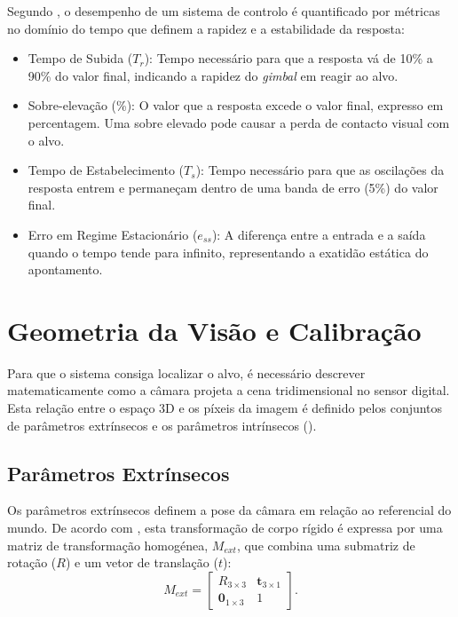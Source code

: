 Segundo \cite{nise2019control}, o desempenho de um sistema de controlo é quantificado por métricas no domínio do tempo que definem a rapidez e a estabilidade da resposta:
\begin{itemize}
    \item Tempo de Subida ($T_r$): Tempo necessário para que a resposta vá de 10\% a 90\% do valor final, indicando a rapidez do \emph{gimbal} em reagir ao alvo.
    \item Sobre-elevação (\%): O valor que a resposta excede o valor final, expresso em percentagem. Uma sobre elevado pode causar a perda de contacto visual com o alvo.
    \item Tempo de Estabelecimento ($T_s$): Tempo necessário para que as oscilações da resposta entrem e permaneçam dentro de uma banda de erro (5\%) do valor final.
    \item Erro em Regime Estacionário ($e_{ss}$): A diferença entre a entrada e a saída quando o tempo tende para infinito, representando a exatidão estática do apontamento.
\end{itemize}

\section{Geometria da Visão e Calibração}

Para que o sistema consiga localizar o alvo, é necessário descrever matematicamente como a câmara projeta a cena tridimensional no sensor digital. Esta relação entre o espaço 3D e os píxeis da imagem é definido pelos conjuntos de parâmetros extrínsecos e os parâmetros intrínsecos (\cite{szeliski2022}).

\subsection{Parâmetros Extrínsecos}
Os parâmetros extrínsecos definem a pose da câmara em relação ao referencial do mundo. De acordo com \cite{szeliski2022}, esta transformação de corpo rígido é expressa por uma matriz de transformação homogénea, $M_{ext}$, que combina uma submatriz de rotação ($R$) e um vetor de translação ($t$):
\begin{equation}
M_{ext} = \begin{bmatrix} 
R_{3 \times 3} & \mathbf{t}_{3 \times 1} \\ 
\mathbf{0}_{1 \times 3} & 1 
\end{bmatrix}.
\end{equation}


